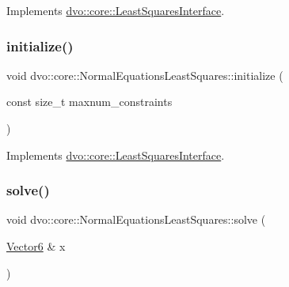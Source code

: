 Implements \mbox{\hyperlink{classdvo_1_1core_1_1_least_squares_interface_a2e580a70e96f0e7d6d70f6047891a42a}{dvo\+::core\+::\+Least\+Squares\+Interface}}.

\mbox{\label{classdvo_1_1core_1_1_normal_equations_least_squares_a4799d66e3dc176ab07418fc1cfacfb53}} 
\subsubsection{\texorpdfstring{initialize()}{initialize()}}
{\footnotesize\ttfamily void dvo\+::core\+::\+Normal\+Equations\+Least\+Squares\+::initialize (\begin{DoxyParamCaption}\item[{const size\+\_\+t}]{maxnum\+\_\+constraints }\end{DoxyParamCaption})\hspace{0.3cm}{\ttfamily [virtual]}}



Implements \mbox{\hyperlink{classdvo_1_1core_1_1_least_squares_interface_a09e5784f74d7352a9550a8aa523d30d7}{dvo\+::core\+::\+Least\+Squares\+Interface}}.

\mbox{\label{classdvo_1_1core_1_1_normal_equations_least_squares_a8a25d3970f6506df2066995f2f2effda}} 
\subsubsection{\texorpdfstring{solve()}{solve()}}
{\footnotesize\ttfamily void dvo\+::core\+::\+Normal\+Equations\+Least\+Squares\+::solve (\begin{DoxyParamCaption}\item[{\mbox{\hyperlink{namespacedvo_1_1core_a05327f3312d32a301bce9fccda9e5807}{Vector6}} \&}]{x }\end{DoxyParamCaption})\hspace{0.3cm}{\ttfamily [virtual]}}



